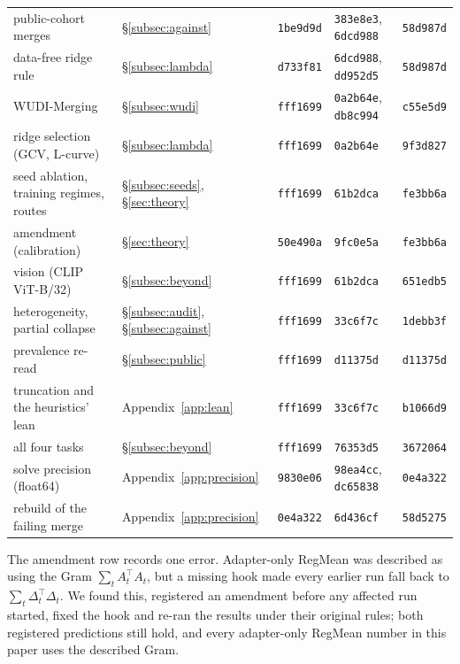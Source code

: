 \begin{table}[pos=h]
\begin{tabular}{p{5.2cm}llp{2.2cm}l}
public-cohort merges & \S\ref{subsec:against} & \texttt{1be9d9d} & \texttt{383e8e3}, \texttt{6dcd988} & \texttt{58d987d} \\
data-free ridge rule & \S\ref{subsec:lambda} & \texttt{d733f81} & \texttt{6dcd988}, \texttt{dd952d5} & \texttt{58d987d} \\
\addlinespace
WUDI-Merging & \S\ref{subsec:wudi} & \texttt{fff1699} & \texttt{0a2b64e}, \texttt{db8c994} & \texttt{c55e5d9} \\
ridge selection (GCV, L-curve) & \S\ref{subsec:lambda} & \texttt{fff1699} & \texttt{0a2b64e} & \texttt{9f3d827} \\
seed ablation, training regimes, routes & \S\ref{subsec:seeds}, \S\ref{sec:theory} & \texttt{fff1699} & \texttt{61b2dca} & \texttt{fe3bb6a} \\
\quad amendment (calibration) & \S\ref{sec:theory} & \texttt{50e490a} & \texttt{9fc0e5a} & \texttt{fe3bb6a} \\
vision (CLIP ViT-B/32) & \S\ref{subsec:beyond} & \texttt{fff1699} & \texttt{61b2dca} & \texttt{651edb5} \\
heterogeneity, partial collapse & \S\ref{subsec:audit}, \S\ref{subsec:against} & \texttt{fff1699} & \texttt{33c6f7c} & \texttt{1debb3f} \\
\quad prevalence re-read & \S\ref{subsec:public} & \texttt{fff1699} & \texttt{d11375d} & \texttt{d11375d} \\
truncation and the heuristics' lean & Appendix~\ref{app:lean} & \texttt{fff1699} & \texttt{33c6f7c} & \texttt{b1066d9} \\
all four tasks & \S\ref{subsec:beyond} & \texttt{fff1699} & \texttt{76353d5} & \texttt{3672064} \\
solve precision (float64) & Appendix~\ref{app:precision} & \texttt{9830e06} & \texttt{98ea4cc}, \texttt{dc65838} & \texttt{0e4a322} \\
\quad rebuild of the failing merge & Appendix~\ref{app:precision} & \texttt{0e4a322} & \texttt{6d436cf} & \texttt{58d5275} \\
\bottomrule
\end{tabular}
\end{table}

The amendment row records one error. Adapter-only RegMean was described
as using the Gram $\sum_t A_t^\top A_t$, but a missing hook made every earlier
run fall back to $\sum_t \Delta_t^\top\Delta_t$. We found this, registered an
amendment before any affected run started, fixed the hook and re-ran the results
under their original rules; both registered predictions still hold, and every
adapter-only RegMean number in this paper uses the described Gram.

